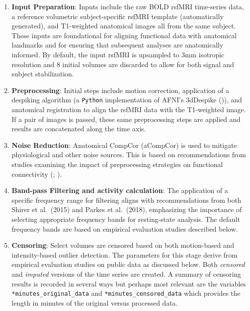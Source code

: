 \documentclass[
  table]{article}
\begin{document}
\begin{enumerate}
\def\labelenumi{\arabic{enumi}.}
\item
  \textbf{Input Preparation}: Inputs include the raw BOLD rsfMRI
  time-series data, a reference volumetric subject-specific rsfMRI
  template (automatically generated), and T1-weighted anatomical images
  all from the same subject. These inputs are foundational for aligning
  functional data with anatomical landmarks and for ensuring that
  subsequent analyses are anatomically informed. By default, the input
  rsfMRI is upsampled to 3mm isotropic resolution and 8 initial volumes
  are discarded to allow for both signal and subject stabilization.
\item
  \textbf{Preprocessing}: Initial steps include motion correction,
  application of a despiking algorithm (a \texttt{Python} implementation
  of AFNI's 3dDespike ()), and
  anatomical registration to align the rsfMRI data with the T1-weighted
  image. If a pair of images is passed, these same preprocessing steps
  are applied and results are concatenated along the time axis.
\item
  \textbf{Noise Reduction}: Anatomical CompCor (aCompCor) is used to
  mitigate physiological and other noise sources. This is based on
  recommendations from studies examining the impact of preprocessing
  strategies on functional connectivity
  (;
  ).
\item
  \textbf{Band-pass Filtering and activity calculation}: The application
  of a specific frequency range for filtering aligns with
  recommendations from both Shirer et al.~(2015) and Parkes et
  al.~(2018), emphasizing the importance of selecting appropriate
  frequency bands for resting-state analysis. The default frequency
  bands are based on empirical evaluation studies described below.
\item
  \textbf{Censoring}: Select volumes are censored based on both
  motion-based and intensity-based outlier detection. The parameters for
  this stage derive from empirical evaluation studies on public data as
  discussed below. Both \emph{censored} and \emph{imputed} versions of
  the time series are created. A summary of censoring results is
  recorded in several ways but perhaps most relevant are the variables
  \texttt{*minutes\_original\_data} and
  \texttt{*minutes\_censored\_data} which provides the length in minutes
  of the original versus processed data.

\end{enumerate}
\end{document}

